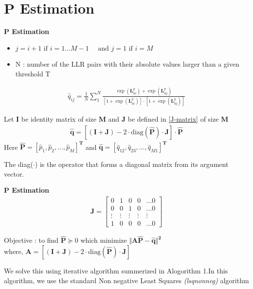 \documentclass{beamer}
\providecommand{\brak}[1]{\ensuremath{\left(#1\right)}}
\providecommand{\sbrak}[1]{\ensuremath{\left[#1\right]}}
\begin{document}
\section{P Estimation}
\begin{frame}{\textbf{P Estimation}}
      \begin{itemize}
        \item $ j = i + 1 \text{ if } i = 1 \dots M - 1 \quad \text{ and } j = 1 \text{ if } i = M$
        \item N : number of the LLR pairs with their absolute values larger than a given threshold T
    \end{itemize}
    \begin{align}
        \hat{q}_{i j}=\frac{1}{N}
        \sum_{1}^{N}
        \frac{
        \exp ({\mathbf{L}^{p}_{\text{u}i}})+\exp ({\mathbf{L}^{p}_{\text{u}j}})
        }
        {
        [{{1+\exp\brak{\mathbf{L}^{p}_{\text{u}i}}}}] \cdot [{1+\exp ({\mathbf{L}^{p}_{\text{uj}}})}]
        }
    \end{align}
    
  
    
    Let $\mathbf{I}$ be identity matrix of size $\mathbf{M}$   and $\mathbf{J}$ be defined in \eqref{J-matrix} of size $\mathbf{M}$
    \begin{align}
        \hat{\mathbf{q}}=\sbrak{\brak{\mathbf{I}+\mathbf{J}}-2\cdot \text{diag}\brak{\hat{\mathbf{P}}}\cdot\mathbf{ J}} \cdot \mathbf{\hat{P}}
    \end{align}
    Here $\mathbf{\hat{P}}=\sbrak{\hat{p}_1,\hat{p}_2,\dots,\hat{p}_M}^\mathbf{T}$ and $\mathbf{\hat{q}}=\sbrak{\hat{q}_{12},\hat{q}_{23},\dots,\hat{q}_{M1}}^\mathbf{T}$
  
    The diag($\cdot$) is the operator that forms a diagonal matrix from
its argument vector.
\end{frame}

\begin{frame}{\textbf{P Estimation}}
    \begin{align}
        \mathbf{J}=
        \begin{bmatrix}
            0 & 1 & 0 & 0 & \dots 0 \\
            0 & 0 & 1 & 0 & \dots 0 \\
            \vdots & \vdots & \vdots & \vdots & \vdots \\
            1 & 0 & 0 & 0 & \dots 0 
        \end{bmatrix}
        \label{J-matrix}
    \end{align}
    
    Objective : to find $\mathbf{\hat{P}} \succcurlyeq 0$ which minimize  
    $\mathbf{\Vert A\hat{{P}}-\hat{q} \Vert ^2}$
    \\ where, $\mathbf{A}=\sbrak{\mathbf{\brak{I+J}}-2\cdot \text{diag}\brak{\mathbf{\hat{P}}}\cdot \mathbf{J}}$
    
    We solve this using iterative algorithm summerized in Alogorithm 1.In this algorithm, we use the standard Non negative Least Squares \textit{(lsqnonneg) } algorithm
\end{frame}
\end{document}
